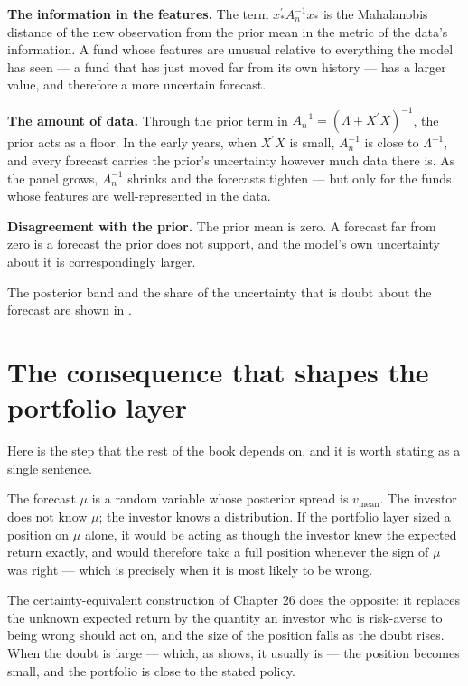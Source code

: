 \textbf{The information in the features.} The term \(x_*^{\prime}A_n^{-1}x_*\)
is the Mahalanobis distance of the new observation from the prior mean in
the metric of the data's information. A fund whose features are unusual
relative to everything the model has seen --- a fund that has just moved
far from its own history --- has a larger value, and therefore a more
uncertain forecast.

\textbf{The amount of data.} Through the prior term in
\(A_n^{-1} = (\Lambda + X^{\prime}X)^{-1}\), the prior acts as a floor. In
the early years, when \(X^{\prime}X\) is small, \(A_n^{-1}\) is close to
\(\Lambda^{-1}\), and every forecast carries the prior's uncertainty
however much data there is. As the panel grows, \(A_n^{-1}\) shrinks and
the forecasts tighten --- but only for the funds whose features are
well-represented in the data.

\textbf{Disagreement with the prior.} The prior mean is zero. A forecast
far from zero is a forecast the prior does not support, and the model's
own uncertainty about it is correspondingly larger.

The posterior band and the share of the uncertainty that is doubt about the forecast are shown in .

\section{The consequence that shapes the portfolio layer}

Here is the step that the rest of the book depends on, and it is worth
stating as a single sentence.

The forecast \(\mu\) is a random variable whose posterior spread is
\(v_{\mathrm{mean}}\). The investor does not know \(\mu\); the investor
knows a distribution. If the portfolio layer sized a position on \(\mu\)
alone, it would be acting as though the investor knew the expected return
exactly, and would therefore take a full position whenever the sign of
\(\mu\) was right --- which is precisely when it is most likely to be
wrong.

The certainty-equivalent construction of Chapter 26 does the opposite: it
replaces the unknown expected return by the quantity an investor who is
risk-averse to being wrong should act on, and the size of the position
falls as the doubt rises. When the doubt is large --- which, as
 shows, it usually is --- the position
becomes small, and the portfolio is close to the stated policy.

